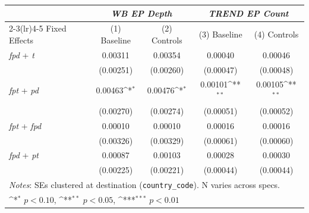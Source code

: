 {
\def\sym#1{\ifmmode^{#1}\else\(^{#1}\)\fi}
\begin{tabular}{lcccc}
\toprule
 & \multicolumn{2}{c}{\textit{WB EP Depth}} & \multicolumn{2}{c}{\textit{TREND EP Count}} \\
\cmidrule(lr){2-3}\cmidrule(lr){4-5}
Fixed Effects & (1) Baseline & (2) Controls & (3) Baseline & (4) Controls \\
\midrule
\textit{fpd} + \textit{t} & 0.00311 & 0.00354 & 0.00040 & 0.00046 \\
 & (0.00251) & (0.00260) & (0.00047) & (0.00048) \\
\addlinespace
\textit{fpt} + \textit{pd} & 0.00463\sym{*} & 0.00476\sym{*} & 0.00101\sym{**} & 0.00105\sym{**} \\
 & (0.00270) & (0.00274) & (0.00051) & (0.00052) \\
\addlinespace
\textit{fpt} + \textit{fpd} & 0.00010 & 0.00010 & 0.00016 & 0.00016 \\
 & (0.00326) & (0.00329) & (0.00061) & (0.00060) \\
\addlinespace
\textit{fpd} + \textit{pt} & 0.00087 & 0.00103 & 0.00028 & 0.00030 \\
 & (0.00225) & (0.00221) & (0.00044) & (0.00044) \\
\midrule
\multicolumn{5}{l}{\footnotesize \textit{Notes}: SEs clustered at destination (\texttt{country\_code}). N varies across specs.} \\
\multicolumn{5}{l}{\footnotesize \sym{*} \(p<0.10\), \sym{**} \(p<0.05\), \sym{***} \(p<0.01\)} \\
\bottomrule
\end{tabular}
}

